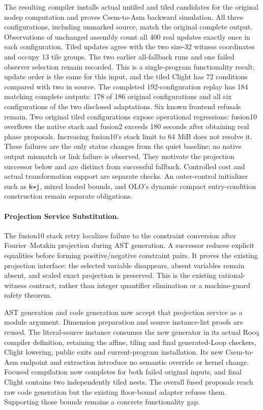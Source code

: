 The resulting compiler installs actual untiled and tiled candidates for the
original nodep computation and proves Csem-to-Asm backward simulation. All three
configurations, including unmarked source, match the original complete output.
Observations of unchanged assembly count all 400 real updates exactly once in
each configuration. Tiled updates agree with the two size-32 witness coordinates
and occupy 13 tile groups. The two earlier all-fallback runs and one failed
observer selection remain recorded. This is a single-program functionality
result; update order is the same for this input, and the tiled Clight has 72
conditions compared with two in source. The completed 192-configuration replay
has 184 matching complete outputs: 178 of 186 original configurations and all
six configurations of the two disclosed adaptations. Six known frontend
refusals remain. Two original tiled configurations expose operational
regressions: fusion10 overflows the native
stack and fusion2 exceeds 180 seconds after obtaining real phase proposals.
Increasing fusion10's stack limit to 64 MiB does not resolve it. These failures
are the only status changes from the quiet baseline; no native output mismatch
or link failure is observed. They motivate the projection successor below and
are distinct from successful fallback. Controlled cost and actual transformation support are separate checks. An
outer-control initializer such as \texttt{k=j}, mixed loaded bounds, and OLO's
dynamic compact entry-condition construction remain separate obligations.

\paragraph{Projection Service Substitution.}
The fusion10 stack retry localizes failure to the constraint conversion after
Fourier--Motzkin projection during AST generation. A successor reduces explicit
equalities before forming positive/negative constraint pairs. It proves the
existing projection interface: the selected variable disappears, absent
variables remain absent, and scaled exact projection is preserved. This is
the existing rational-witness contract, rather than integer quantifier
elimination or a machine-guard safety theorem.

AST generation and code generation now accept that projection service as a
module argument. Dimension preparation and source instance-list proofs are
reused. The literal-source instance consumes the new generator in its actual
Rocq compiler definition, retaining the affine, tiling and final generated-Loop
checkers, Clight lowering, public exits and current-program installation.
Its new Csem-to-Asm endpoint and extraction introduce no semantic override or
kernel change. Focused compilation now completes for both failed original
inputs, and final Clight contains two independently tiled nests. The overall
fused proposals reach raw code generation but the existing floor-bound adapter
refuses them. Supporting those bounds remains a concrete functionality gap.


